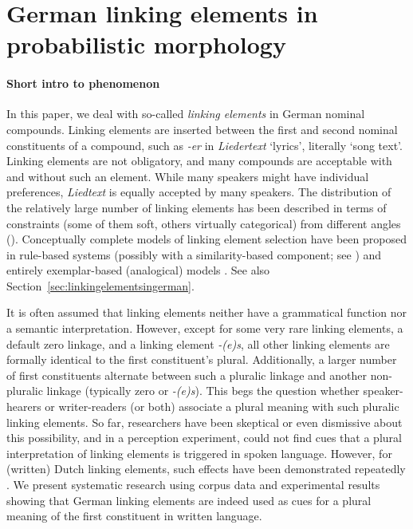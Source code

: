 \section{German linking elements in probabilistic morphology}
\label{sec:germanlinkingelementsinprobabilisticmorphology}

\paragraph{Short intro to phenomenon}

In this paper, we deal with so-called \textit{linking elements} in German nominal compounds.
Linking elements are inserted between the first and second nominal constituents of a compound, such as \textit{-er} in \textit{Liedertext} `lyrics', literally `song text'.
Linking elements are not obligatory, and many compounds are acceptable with and without such an element.
While many speakers might have individual preferences, \textit{Liedtext} is equally accepted by many speakers.
The distribution of the relatively large number of linking elements has been described in terms of constraints (some of them soft, others virtually categorical) from different angles (\egg \citealt{Fuhrhop1996,Wegener2003,Schluecker2012,NueblingSzczepaniak2013,FuhrhopKuerschner2015}).
Conceptually complete models of linking element selection have been proposed in rule-based systems (possibly with a similarity-based component; see \citealt{DresslerEa2001}) and entirely exemplar-based (analogical) models \parencite{KrottEa2007}.
See also Section~\ref{sec:linkingelementsingerman}.

It is often assumed that linking elements neither have a grammatical function nor a semantic interpretation.
However, except for some very rare linking elements, a default zero linkage, and a linking element \textit{-(e)s}, all other linking elements are formally identical to the first constituent's plural.
Additionally, a larger number of first constituents alternate between such a pluralic linkage and another non-pluralic linkage (typically zero or \textit{-(e)s}).
This begs the question whether speaker-hearers or writer-readers (or both) associate a plural meaning with such pluralic linking elements.
So far, researchers have been skeptical or even dismissive about this possibility, and in a perception experiment, \textcite{KoesterEa2004} could not find cues that a plural interpretation of linking elements is triggered in spoken language.
However, for (written) Dutch linking elements, such effects have been demonstrated repeatedly \parencite{SchreuderEa1998,BangaEa2012,BangaEa2013a,BangaEa2013b}.
We present systematic research using corpus data and experimental results showing that German linking elements are indeed used as cues for a plural meaning of the first constituent in written language.

